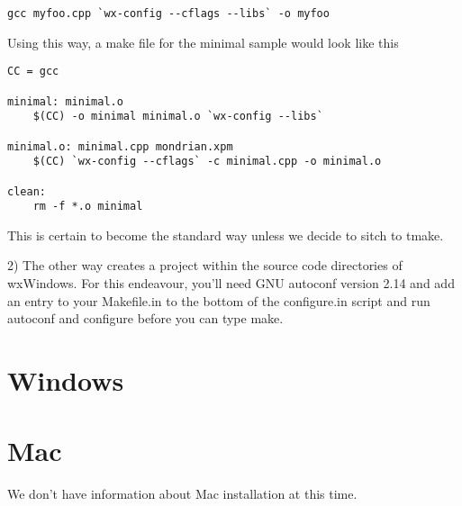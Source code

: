 \begin{verbatim}
gcc myfoo.cpp `wx-config --cflags --libs` -o myfoo
\end{verbatim}

Using this way, a make file for the minimal sample would look
like this

\begin{verbatim}
CC = gcc

minimal: minimal.o
    $(CC) -o minimal minimal.o `wx-config --libs` 

minimal.o: minimal.cpp mondrian.xpm
    $(CC) `wx-config --cflags` -c minimal.cpp -o minimal.o

clean: 
	rm -f *.o minimal
\end{verbatim}

This is certain to become the standard way unless we decide
to sitch to tmake.

2) The other way creates a project within the source code 
directories of wxWindows. For this endeavour, you'll need
GNU autoconf version 2.14 and add an entry to your Makefile.in
to the bottom of the configure.in script and run autoconf
and configure before you can type make.

\section{Windows}\label{installwindows}


\section{Mac}\label{installmac}

We don't have information about Mac installation at this time.


